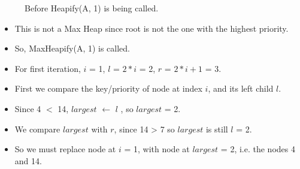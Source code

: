  
\begin{figure}[h]
\centering
{}
\caption{Before Heapify(A, 1) is being called.}
\end{figure}

\begin{itemize}
\item This is not a Max Heap since root is not the one with the highest priority.
\item So, Max\textunderscore Heapify(A, 1) is called.
\item For first iteration, $i$ = 1, $l$ = $2*i$ = 2, $r$ = $2*i + 1$ = 3.
\item First we compare the key/priority of node at index $i$, and its left child $l$.
\item Since 4 $<$ 14, $largest$ $\gets$ $l$ , so $largest$ = 2.
\item We compare $largest$ with $r$, since 14 > 7 so $largest$ is still $l$ = 2.
\item So we must replace node at $i$ = 1, with node at $largest$ = 2, i.e. the nodes 4 and 14.

\end{itemize}




